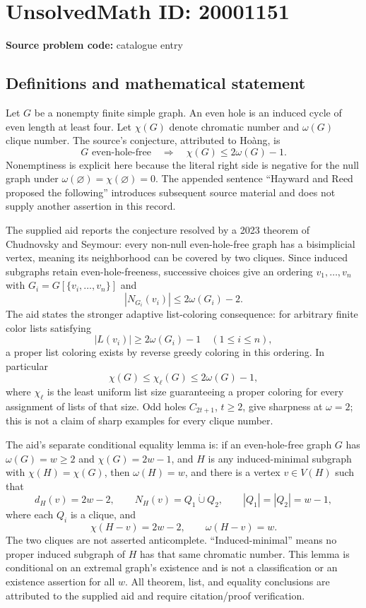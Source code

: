 \documentclass[11pt]{article}
\begin{document}
\section*{UnsolvedMath ID: 20001151}
\textbf{Source problem code:} catalogue entry
\subsection{Definitions and mathematical statement}
Let \(G\) be a nonempty finite simple graph. An even hole is an induced cycle of even length at least four. Let \(\chi(G)\) denote chromatic number and \(\omega(G)\) clique number. The source's conjecture, attributed to Ho\`ang, is
\[
 G\text{ even-hole-free}\quad\Longrightarrow\quad
 \chi(G)\le2\omega(G)-1.
\]
Nonemptiness is explicit here because the literal right side is negative for the null graph under \(\omega(\varnothing)=\chi(\varnothing)=0\). The appended sentence ``Hayward and Reed proposed the following'' introduces subsequent source material and does not supply another assertion in this record.

The supplied aid reports the conjecture resolved by a 2023 theorem of Chudnovsky and Seymour: every non-null even-hole-free graph has a bisimplicial vertex, meaning its neighborhood can be covered by two cliques. Since induced subgraphs retain even-hole-freeness, successive choices give an ordering \(v_1,\ldots,v_n\) with \(G_i=G[\{v_i,\ldots,v_n\}]\) and
\[
 |N_{G_i}(v_i)|\le2\omega(G_i)-2.
\]
The aid states the stronger adaptive list-coloring consequence: for arbitrary finite color lists satisfying
\[
 |L(v_i)|\ge2\omega(G_i)-1\quad(1\le i\le n),
\]
a proper list coloring exists by reverse greedy coloring in this ordering. In particular
\[
 \chi(G)\le\chi_\ell(G)\le2\omega(G)-1,
\]
where \(\chi_\ell\) is the least uniform list size guaranteeing a proper coloring for every assignment of lists of that size. Odd holes \(C_{2t+1}\), \(t\ge2\), give sharpness at \(\omega=2\); this is not a claim of sharp examples for every clique number.

The aid's separate conditional equality lemma is: if an even-hole-free graph \(G\) has \(\omega(G)=w\ge2\) and \(\chi(G)=2w-1\), and \(H\) is any induced-minimal subgraph with \(\chi(H)=\chi(G)\), then \(\omega(H)=w\), and there is a vertex \(v\in V(H)\) such that
\[
 d_H(v)=2w-2,\qquad
 N_H(v)=Q_1\mathbin{\dot\cup}Q_2,
 \qquad |Q_1|=|Q_2|=w-1,
\]
where each \(Q_i\) is a clique, and
\[
 \chi(H-v)=2w-2,\qquad\omega(H-v)=w.
\]
The two cliques are not asserted anticomplete. ``Induced-minimal'' means no proper induced subgraph of \(H\) has that same chromatic number. This lemma is conditional on an extremal graph's existence and is not a classification or an existence assertion for all \(w\). All theorem, list, and equality conclusions are attributed to the supplied aid and require citation/proof verification.
\end{document}
